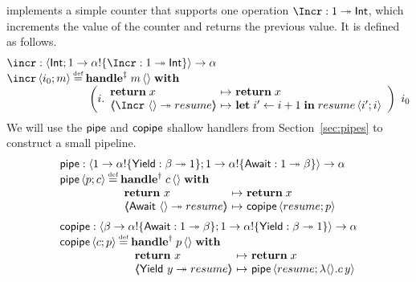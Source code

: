\documentclass[12pt,phd,lfcs,twoside,openright,logo,leftchapter,normalheadings]{infthesis}
\theoremstyle{plain}
\theoremstyle{definition}
\begin{document}
implements a simple counter that supports one operation
$\Incr : \UnitType \opto \Int$, which increments the value of the
counter and returns the previous value. It is defined as follows.
%
\[
  \bl
  \incr : \Record{\Int;\UnitType \to \alpha\eff \{\Incr : \UnitType \opto \Int\}} \to \alpha\\
  \incr\,\Record{i_0;m} \defas
  \bl
  \ParamHandle\;m\,\Unit\;\With\\
  ~\left(i.\,\ba{@{~}l@{~}c@{~}l}
       \Return\;x &\mapsto& \Return\;x\\
       \OpCase{\Incr}{\Unit}{resume} &\mapsto& \Let\;i' \revto i+1\;\In\;resume\,\Record{i';i}
     \ea\right)~i_0
  \el
  \el
\]
%
We will use the $\mathsf{pipe}$ and $\mathsf{copipe}$ shallow handlers from
Section~\ref{sec:pipes} to construct a small pipeline.
%
\[
  \bl
   \Pipe   : \Record{\UnitType \to \alpha \eff \{ \Yield : \beta \opto \UnitType \}; \UnitType \to \alpha\eff\{ \Await : \UnitType \opto \beta \}}          \to \alpha \\
   \Pipe\, \Record{p; c} \defas
        \bl
          \ShallowHandle\; c\,\Unit \;\With\; \\
           ~\ba[m]{@{}l@{~}c@{~}l@{}}
              \Return~x &\mapsto& \Return\;x \\
              \OpCase{\Await}{\Unit}{resume}  &\mapsto& \Copipe\,\Record{resume; p} \\
            \ea
        \el\medskip\\

   \Copipe : \Record{\beta \to \alpha\eff\{ \Await : \UnitType \opto \beta\};    \UnitType \to \alpha\eff\{ \Yield : \beta \opto \UnitType\}} \to \alpha \\
   \Copipe\, \Record{c; p} \defas
      \bl
         \ShallowHandle\; p\,\Unit \;\With\; \\
          ~\ba[m]{@{}l@{~}c@{~}l@{}}
             \Return~x &\mapsto& \Return\;x \\
             \OpCase{\Yield}{y}{resume} &\mapsto& \Pipe\,\Record{resume; \lambda \Unit. c\, y} \\
           \ea \\
      \el \\
\el
\]
\end{document}
